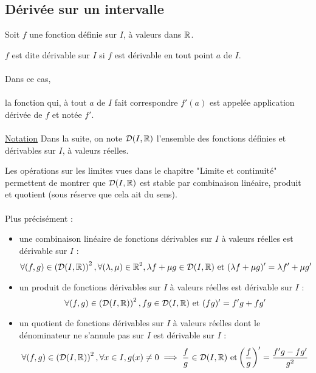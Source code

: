 \subsection{Dérivée sur un intervalle}
Soit \(f\) une fonction définie sur \(I\), à valeurs dans \(\mathbb{R}\).
\begin{defi}
	\(f\) est dite dérivable sur \(I\) si \(f\) est dérivable en tout point \(a\) de \(I\).\\~\\
	Dans ce cas,\\~\\
	la fonction qui, à tout \(a\) de \(I\) fait correspondre \(f '(a)\) est appelée application dérivée de \(f\) et notée \(f '\).\\~\\
	\underline{Notation}
	Dans la suite, on note \(\mathcal{D} (I, \mathbb{R})\) l’ensemble des fonctions définies et dérivables sur \(I\), à valeurs réelles.
\end{defi}

\begin{defprop}
	Les opérations sur les limites vues dans le chapitre "Limite et continuité" permettent de montrer que \(\mathcal{D} (I, \mathbb{R})\) est stable par combinaison linéaire, produit et quotient (sous réserve que cela ait du sens).\\~\\
	Plus précisément :
	\begin{itemize}
		\item une combinaison linéaire de fonctions dérivables sur \(I\) à valeurs réelles est dérivable sur \(I\) :
		      \[\forall(f, g) \in \left(\mathcal{D}(I,\mathbb{R})\right)^2 , \forall(\lambda, \mu) \in \mathbb{R} ^2, \lambda f + \mu g \in \mathcal{D}(I,\mathbb{R})\text{ et }(\lambda f + \mu g)' = \lambda f ' + \mu g'\]
		\item un produit de fonctions dérivables sur \(I\) à valeurs réelles est dérivable sur \(I\) :
		      \[\forall(f, g) \in \left(\mathcal{D}(I,\mathbb{R})\right)^2 , f g \in \mathcal{D}(I,\mathbb{R})\text{ et }(f g)' = f 'g + f g'\]
		\item un quotient de fonctions dérivables sur \(I\) à valeurs réelles dont le dénominateur ne s’annule pas sur \(I\) est dérivable sur \(I\) :
		      \[\forall(f, g) \in \left(\mathcal{D}(I,\mathbb{R})\right)^2 , \forall x \in I, g(x)\neq 0 \implies \frac{f}{g}\in \mathcal{D}(I,\mathbb{R})\text{ et} \left(\frac{f}{g}\right)' = \frac{f 'g - f g'}{g^2}\]
	\end{itemize}
\end{defprop}

